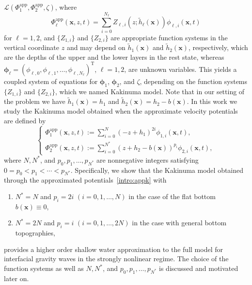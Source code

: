 \documentclass[11pt,leqno]{article}
\numberwithin{equation}{section}
\numberwithin{figure}{section}
\begin{document}
$\mathscr{L}(\Phi_1^\mathrm{app},\Phi_2^\mathrm{app},\zeta)$, where
%
\begin{equation}\label{intro:app}
\Phi_\ell^\mathrm{app}(\bm{x},z,t) = \sum_{i=0}^{N_\ell} Z_{\ell,i}(z;\tilde{h}_\ell(\bm{x}))\phi_{\ell,i}(\bm{x},t)
\end{equation}
%
for $\ell=1,2$, and $\{Z_{1,i}\}$ and $\{Z_{2,i}\}$ are appropriate function systems 
in the vertical coordinate $z$ and may depend on 
$\tilde{h}_1(\bm{x})$ and $\tilde{h}_2(\bm{x})$, 
respectively, which are the depths of the upper and the lower layers in the rest state, 
whereas $\bm{\phi}_\ell=(\phi_{\ell,0},\phi_{\ell,1},\ldots,\phi_{\ell,N_\ell})^\mathrm{T}$, $\ell=1,2$, are unknown variables. 
This yields a coupled system of equations for $\bm{\phi}_1$, $\bm{\phi}_2$, and $\zeta$, 
depending on the function systems $\{Z_{1,i}\}$ and $\{Z_{2,i}\}$, which we named Kakinuma model. 
Note that in our setting of the problem we have $\tilde{h}_1(\bm{x})=h_1$ and $\tilde{h}_2(\bm{x})=h_2-b(\bm{x})$. 
In this work we study the Kakinuma model obtained when the approximate velocity potentials
are defined by
\begin{equation}\label{intro:appk}
	\begin{cases}
		\displaystyle
		\Phi_1^\mathrm{app}(\bm{x},z,t) := \sum_{i=0}^N (-z+h_1)^{2i}\phi_{1,i}(\bm{x},t), \\[2.5ex]
		\displaystyle
		\Phi_2^\mathrm{app}(\bm{x},z,t) := \sum_{i=0}^{N^*} (z+h_2-b(\bm{x}))^{p_i}\phi_{2,i}(\bm{x},t),
	\end{cases}
\end{equation}
%
where $N, N^*$, and $p_0,p_1,\ldots,p_{N^*}$ are nonnegative integers satisfying ${0=p_0<p_1<\cdots<p_{N^*}}$.
Specifically, we show that the Kakinuma model obtained through the approximated potentials~\eqref{intro:appk} with 
%
\begin{enumerate}
	\item[(H1)]
	$N^*=N$ and $p_i=2i$ $(i=0,1,\ldots,N)$ in the case of the flat bottom $b(\bm{x})\equiv0$, 
	\item[(H2)]
	$N^*=2N$ and $p_i=i$ $(i=0,1,\ldots,2N)$ in the case with general bottom topographies, 
\end{enumerate}
%
provides a higher order shallow water approximation to the full model for interfacial gravity waves in the strongly nonlinear regime. 
The choice of the function systems as well as $N, N^*$, and $p_0,p_1,\ldots,p_{N^*}$ is discussed and motivated later on. 


\end{document}
